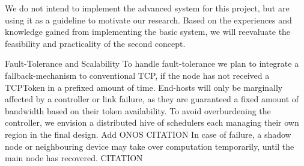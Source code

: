We do not intend to implement the advanced system for this project, but are using it as a guideline to motivate our research. Based on the experiences and knowledge gained from implementing the basic system, we will reevaluate the feasibility and practicality of the second concept.



Fault-Tolerance and Scalability
To handle fault-tolerance we plan to integrate a fallback-mechanism to conventional TCP, if the node has not received a TCPToken in a prefixed amount of time. End-hosts will only be marginally affected by a controller or link failure, as they are guaranteed a fixed amount of bandwidth based on their token availability.
To avoid overburdening the controller, we envision a distributed hive of schedulers each managing their own region in the final design. Add ONOS CITATION In case of failure, a shadow node or neighbouring device may take over computation temporarily, until the main node has recovered. CITATION